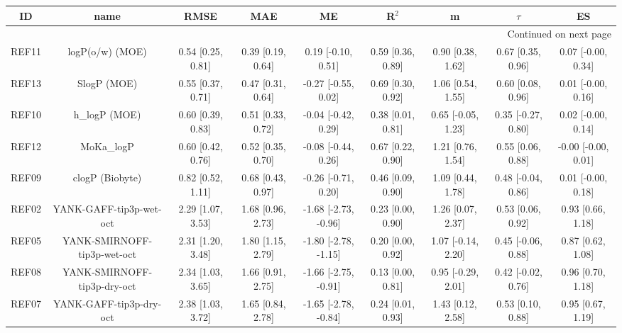 \documentclass{article}
\begin{document}
\begin{center}
\scriptsize
\begin{longtable}{|ccccccccc|}
\toprule
    ID &                            name &               RMSE &                MAE &                    ME &              R$^2$ &                   m &              $\tau$ &                   ES \\
\midrule
\endhead
\midrule
\multicolumn{9}{r}{{Continued on next page}} \\
\midrule
\endfoot

\bottomrule
\endlastfoot
 REF11 &                 logP(o/w) (MOE) &  0.54 [0.25, 0.81] &  0.39 [0.19, 0.64] &    0.19 [-0.10, 0.51] &  0.59 [0.36, 0.89] &   0.90 [0.38, 1.62] &   0.67 [0.35, 0.96] &   0.07 [-0.00, 0.34] \\
 REF13 &                     SlogP (MOE) &  0.55 [0.37, 0.71] &  0.47 [0.31, 0.64] &   -0.27 [-0.55, 0.02] &  0.69 [0.30, 0.92] &   1.06 [0.54, 1.55] &   0.60 [0.08, 0.96] &   0.01 [-0.00, 0.16] \\
 REF10 &                   h\_logP (MOE) &  0.60 [0.39, 0.83] &  0.51 [0.33, 0.72] &   -0.04 [-0.42, 0.29] &  0.38 [0.01, 0.81] &  0.65 [-0.05, 1.23] &  0.35 [-0.27, 0.80] &   0.02 [-0.00, 0.14] \\
 REF12 &                      MoKa\_logP &  0.60 [0.42, 0.76] &  0.52 [0.35, 0.70] &   -0.08 [-0.44, 0.26] &  0.67 [0.22, 0.90] &   1.21 [0.76, 1.54] &   0.55 [0.06, 0.88] &  -0.00 [-0.00, 0.01] \\
 REF09 &                 clogP (Biobyte) &  0.82 [0.52, 1.11] &  0.68 [0.43, 0.97] &   -0.26 [-0.71, 0.20] &  0.46 [0.09, 0.90] &   1.09 [0.44, 1.78] &  0.48 [-0.04, 0.86] &   0.01 [-0.00, 0.18] \\
 REF02 &         YANK-GAFF-tip3p-wet-oct &  2.29 [1.07, 3.53] &  1.68 [0.96, 2.73] &  -1.68 [-2.73, -0.96] &  0.23 [0.00, 0.90] &   1.26 [0.07, 2.37] &   0.53 [0.06, 0.92] &    0.93 [0.66, 1.18] \\
 REF05 &     YANK-SMIRNOFF-tip3p-wet-oct &  2.31 [1.20, 3.48] &  1.80 [1.15, 2.79] &  -1.80 [-2.78, -1.15] &  0.20 [0.00, 0.92] &  1.07 [-0.14, 2.20] &  0.45 [-0.06, 0.88] &    0.87 [0.62, 1.08] \\
 REF08 &     YANK-SMIRNOFF-tip3p-dry-oct &  2.34 [1.03, 3.65] &  1.66 [0.91, 2.75] &  -1.66 [-2.75, -0.91] &  0.13 [0.00, 0.81] &  0.95 [-0.29, 2.01] &  0.42 [-0.02, 0.76] &    0.96 [0.70, 1.18] \\
 REF07 &         YANK-GAFF-tip3p-dry-oct &  2.38 [1.03, 3.72] &  1.65 [0.84, 2.78] &  -1.65 [-2.78, -0.84] &  0.24 [0.01, 0.93] &   1.43 [0.12, 2.58] &   0.53 [0.10, 0.88] &    0.95 [0.67, 1.19] \\

\end{longtable}
\end{center}
\end{document}

